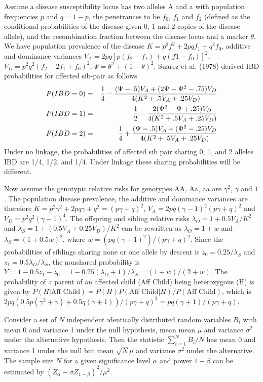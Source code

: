 Assume a disease susceptibility locus has two alleles A and a with population
frequencies $p$ and $q=1-p$, the penetrances to be $f_0$, $f_1$ and $f_2$
(defined as the conditional probabilities of the disease given 0, 1 and 2
copies of the disease allele), and the recombination fraction between the
disease locus and a marker $\theta$.  We have population prevalence of the
disease $K = p^2f^2+2pqf_1+q^2f_0$, additive and dominance variances $V_A =
2pq[p(f_2-f_1)+q(f1-f_0)]^2$, $V_D = p^2q^2(f_2-2f_1+f_0)^2$, $\Psi =
\theta^2+(1-\theta)^2$.  Suarez et al.  (1978) derived IBD probabilities for
affected sib-pair as follows \begin{eqnarray*} P(IBD=0) & = &\frac{1}{4}-
\frac{(\Psi-.5)V_A+(2 \Psi - \Psi^2 - .75)V_D} {4(K^2 + .5V_A + .25V_D)} \cr
P(IBD=1) & = &\frac{1}{2}- \frac{2(\Psi^2-\Psi+.25)V_D} {4(K^2 + .5V_A +
.25V_D)} \cr P(IBD=2) & = &\frac{1}{4}+ \frac{(\Psi-.5)V_A+(\Psi^2 - .25)V_D}
{4(K^2 + .5V_A + .25V_D)} \end{eqnarray*} Under no linkage, the probabilities
of affected sib pair sharing 0, 1, and 2 alleles IBD are 1/4, 1/2, and 1/4.
Under linkage these sharing probabilities will be different.

Now assume the genotypic relative risks for genotypes AA, Aa, aa are
$\gamma^2$, $\gamma$ and $1$.  The population disease prevalence, the additive
and dominance variances are therefore
$K=p^2\gamma^2+2pq\gamma+q^2=(p\gamma+q)^2$, $V_A=2pq(\gamma-1)^2(p\gamma+q)^2$
and $V_D=p^2q^2(\gamma-1)^4$.  The offspring and sibling relative risks
$\lambda_O=1+{0.5V_A}/{K^2}$ and $\lambda_S=1+{(0.5V_A+0.25V_D)}/{K^2}$ can be
rewritten as $\lambda_O=1+w$ and $\lambda_S=(1+0.5w)^2$, where
$w={(pq(\gamma-1)^2)}/{(p\gamma+q)^2}$.  Since the probabilities of siblings
sharing none or one allele by descent is $z_0={0.25}/{\lambda_S}$ and
$z_1={0.5\lambda_O}/{\lambda_S}$, the nonshared probability is
$Y=1-0.5z_1-z_0=1-{0.25(\lambda_O+1)}/{\lambda_S}={(1+w)}/{(2+w)}$.  The
probability of a parent of an affected child (Aff Child) being heterozygous (H)
is given by $P(H|\mbox{Aff Child})={P(H)P(\mbox{Aff Child}|H)}/{P(\mbox{Aff
Child})}$, which is ${2pq(0.5p(\gamma^2+\gamma)+0.5q(\gamma+1))}/
{(p\gamma+q)^2}={pq(\gamma+1)}/{(p\gamma+q)}$.

Consider a set of $N$ independent identically distributed random variables
$B_i$ with mean 0 and variance 1 under the null hypothesis, mean mean $\mu$ and
variance $\sigma^2$ under the alternative hypothesis.  Then the statistic
$\sum_{i=1}^N B_i/N$ has mean 0 and variance 1 under the null but mean
$\sqrt{N}\mu$ and variance $\sigma^2$ under the alternative.  The sample size
$N$ for a given significance level $\alpha$ and power $1-\beta$ can be
estimated by $(Z_\alpha-\sigma Z_{1-\beta})^2/\mu^2$.

